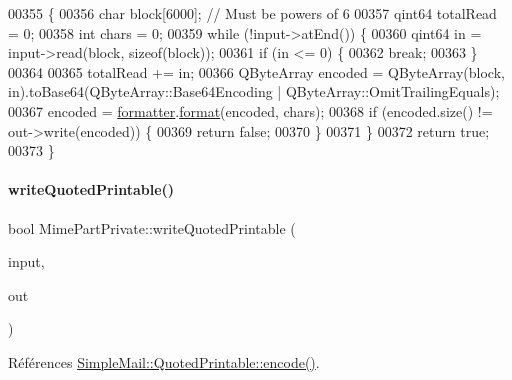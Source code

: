 \begin{DoxyCode}
00355 \{
00356     \textcolor{keywordtype}{char} block[6000]; \textcolor{comment}{// Must be powers of 6}
00357     qint64 totalRead = 0;
00358     \textcolor{keywordtype}{int} chars = 0;
00359     \textcolor{keywordflow}{while} (!input->atEnd()) \{
00360         qint64 in = input->read(block, \textcolor{keyword}{sizeof}(block));
00361         \textcolor{keywordflow}{if} (in <= 0) \{
00362             \textcolor{keywordflow}{break};
00363         \}
00364 
00365         totalRead += in;
00366         QByteArray encoded = QByteArray(block, in).toBase64(QByteArray::Base64Encoding | 
      QByteArray::OmitTrailingEquals);
00367         encoded = \hyperlink{class_simple_mail_1_1_mime_part_private_a0a630f148c8e8070c73b60c75e9777a4}{formatter}.\hyperlink{class_simple_mail_1_1_mime_content_formatter_ac36a08fb6878efb0a6450170ebfc8766}{format}(encoded, chars);
00368         \textcolor{keywordflow}{if} (encoded.size() != out->write(encoded)) \{
00369             \textcolor{keywordflow}{return} \textcolor{keyword}{false};
00370         \}
00371     \}
00372     \textcolor{keywordflow}{return} \textcolor{keyword}{true};
00373 \}
\end{DoxyCode}
\mbox{\label{class_simple_mail_1_1_mime_part_private_a075937d19cf60c10f765154aa30fa4b6}} 
\paragraph{\texorpdfstring{write\+Quoted\+Printable()}{writeQuotedPrintable()}}
{\footnotesize\ttfamily bool Mime\+Part\+Private\+::write\+Quoted\+Printable (\begin{DoxyParamCaption}\item[{Q\+I\+O\+Device $\ast$}]{input,  }\item[{Q\+I\+O\+Device $\ast$}]{out }\end{DoxyParamCaption})}



Références \hyperlink{class_simple_mail_1_1_quoted_printable_a8426b74cafe1c93232ac60d3f077c9e8}{Simple\+Mail\+::\+Quoted\+Printable\+::encode()}.


